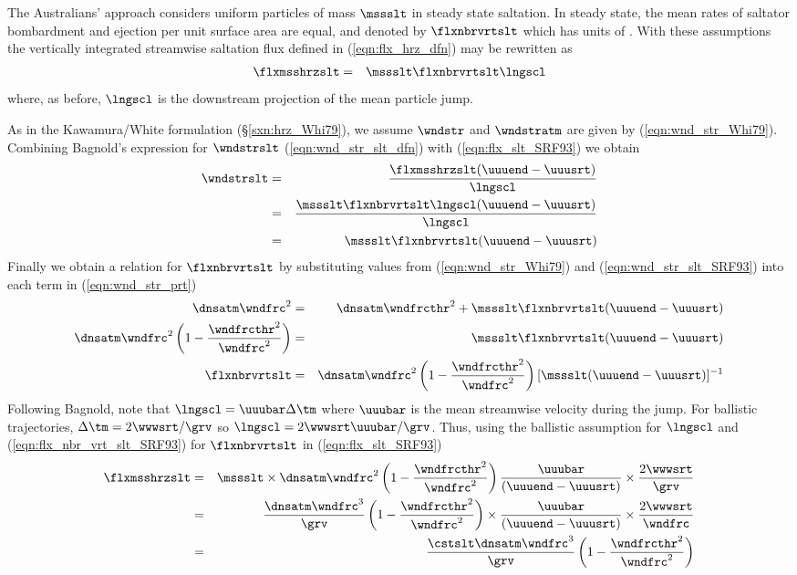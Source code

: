 \documentclass[12pt,twoside]{book}
\begin{document}
The Australians' approach considers uniform particles of mass
$\mssslt$ in steady state saltation. 
In steady state, the mean rates of saltator bombardment and ejection 
per unit surface area are equal, and denoted by $\flxnbrvrtslt$ which has
units of \xmSs. 
With these assumptions the vertically integrated streamwise saltation
flux defined in (\ref{eqn:flx_hrz_dfn}) may be rewritten as  
\begin{eqnarray}
\flxmsshrzslt & = & \mssslt \flxnbrvrtslt \lngscl
\label{eqn:flx_slt_SRF93}
\end{eqnarray}
where, as before, $\lngscl$ is the downstream projection of the mean
particle jump. 

As in the Kawamura/White formulation (\S\ref{sxn:hrz_Whi79}), 
we assume $\wndstr$ and $\wndstratm$ are given by
(\ref{eqn:wnd_str_Whi79}).
Combining Bagnold's expression for $\wndstrslt$
(\ref{eqn:wnd_str_slt_dfn}) with (\ref{eqn:flx_slt_SRF93}) we obtain
\begin{eqnarray}
\wndstrslt & = & \frac{\flxmsshrzslt (\uuuend - \uuusrt)}{\lngscl }
\nonumber \\
& = & \frac{\mssslt \flxnbrvrtslt \lngscl (\uuuend - \uuusrt)}{\lngscl }
\nonumber \\
& = & \mssslt \flxnbrvrtslt (\uuuend - \uuusrt) 
\label{eqn:wnd_str_slt_SRF93}
\end{eqnarray}
Finally we obtain a relation for $\flxnbrvrtslt$ by substituting
values from (\ref{eqn:wnd_str_Whi79}) and
(\ref{eqn:wnd_str_slt_SRF93}) into  each term in
(\ref{eqn:wnd_str_prt}) 
\begin{eqnarray}
\dnsatm \wndfrc^{2} & = & \dnsatm \wndfrcthr^{2} + 
\mssslt \flxnbrvrtslt (\uuuend - \uuusrt) \nonumber \\
\dnsatm \wndfrc^{2} \left( 1 - \frac{\wndfrcthr^{2}}{\wndfrc^{2} } \right)
& = & 
\mssslt \flxnbrvrtslt (\uuuend - \uuusrt) \nonumber \\
\flxnbrvrtslt & = & 
\dnsatm \wndfrc^{2} \left( 1 - \frac{\wndfrcthr^{2}}{\wndfrc^{2} } \right)
[ \mssslt ( \uuuend - \uuusrt ) ]^{-1}
\label{eqn:flx_nbr_vrt_slt_SRF93}
\end{eqnarray}
Following Bagnold, \cite{SRF93} note that $\lngscl = \uuubar \Delta
\tm$ where $\uuubar$ is the mean streamwise velocity during the jump.
For ballistic trajectories, $\Delta \tm = 2 \wwwsrt / \grv$ so 
$\lngscl = 2 \wwwsrt \uuubar / \grv$.
Thus, using the ballistic assumption for $\lngscl$ and
(\ref{eqn:flx_nbr_vrt_slt_SRF93}) for $\flxnbrvrtslt$ in
(\ref{eqn:flx_slt_SRF93}) 
\begin{eqnarray}
\flxmsshrzslt & = & 
\mssslt \times
\dnsatm \wndfrc^{2} \left( 1 - \frac{\wndfrcthr^{2}}{\wndfrc^{2} } \right)
\frac{\uuubar}{( \uuuend - \uuusrt ) } \times
\frac{2 \wwwsrt}{\grv } \nonumber \\
\label{eqn:flx_slt_SRF93_2}
& = & \frac{\dnsatm \wndfrc^{3}}{\grv }
\left( 1 - \frac{\wndfrcthr^{2}}{\wndfrc^{2} } \right) \times
\frac{\uuubar}{( \uuuend - \uuusrt ) } \times
\frac{2 \wwwsrt}{\wndfrc } \\
\label{eqn:flx_slt_SRF93_3}
& = & 
\frac{\cstslt \dnsatm \wndfrc^{3}}{\grv }
\left( 1 - \frac{\wndfrcthr^{2}}{\wndfrc^{2} } \right)
\end{eqnarray}
\end{document}

